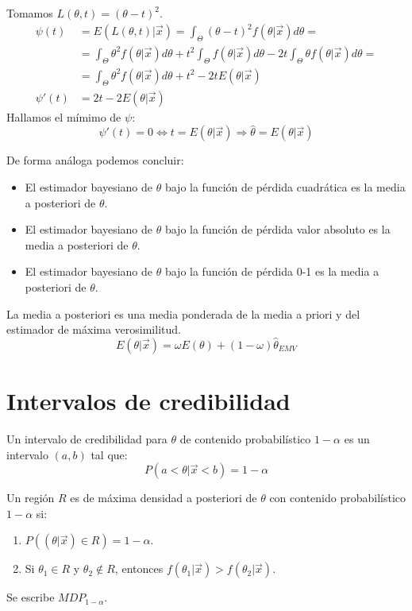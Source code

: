 \begin{example}
    Tomamos $L(\theta, t) = (\theta-t)^2$.
    \begin{align*}
        \psi(t)  & = E(L(\theta, t)|\vec{x}) = \int_\Theta (\theta-t)^2f(\theta|\vec{x})d\theta =                                                             \\
                 & = \int_\Theta \theta^2f(\theta|\vec{x})d\theta + t^2\int_\Theta f(\theta|\vec{x})d\theta - 2t\int_\Theta \theta f(\theta|\vec{x})d\theta = \\
                 & = \int_\Theta \theta^2f(\theta|\vec{x})d\theta + t^2 - 2tE(\theta|\vec{x})                                                                 \\
        \psi'(t) & = 2t - 2E(\theta|\vec{x})
    \end{align*}
    Hallamos el mímimo de $\psi$:
    $$\psi'(t) = 0 \Leftrightarrow t = E(\theta|\vec{x}) \Rightarrow \hat{\theta} = E(\theta|\vec{x})$$
\end{example}

De forma análoga podemos concluir:
\begin{itemize}
    \item El estimador bayesiano de $\theta$ bajo la función de pérdida cuadrática es la media a posteriori de $\theta$.
    \item El estimador bayesiano de $\theta$ bajo la función de pérdida valor absoluto es la media a posteriori de $\theta$.
    \item El estimador bayesiano de $\theta$ bajo la función de pérdida 0-1 es la media a posteriori de $\theta$.
\end{itemize}

\begin{remark}
    La media a posteriori es una media ponderada de la media a priori y del estimador de máxima verosimilitud.
    $$E(\theta|\vec{x}) = \omega E(\theta) + (1-\omega)\hat{\theta}_{EMV}$$
\end{remark}

\section{Intervalos de credibilidad}
Un intervalo de credibilidad para $\theta$ de contenido probabilístico $1-\alpha$ es un intervalo $(a, b)$ tal que:
$$P(a < \theta|\vec{x} < b) = 1-\alpha$$

\begin{definition}
    Un región $R$ es de máxima densidad a posteriori de $\theta$ con contenido probabilístico $1-\alpha$ si:
    \begin{enumerate}
        \item $P((\theta|\vec{x}) \in R) = 1-\alpha$.
        \item Si $\theta_1 \in R$ y $\theta_2 \notin R$, entonces $f(\theta_1|\vec{x}) > f(\theta_2|\vec{x})$.
    \end{enumerate}
    Se escribe $MDP_{1-\alpha}$.
\end{definition}

